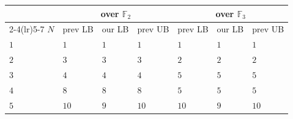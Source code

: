 \documentclass[11pt]{article}
\theoremstyle{definition}
\newcommand{\F}{\mathbb{F}}
\begin{document}
\begin{table}[!ht]
  \centering
  \setlength{\tabcolsep}{6pt}
  \begin{tabular}{lllllll}
    \toprule
    & \multicolumn{3}{c}{over $\F_2$}                             & \multicolumn{3}{c}{over $\F_3$}                                                                                                                                                                                                            \\
    \cmidrule(lr){2-4}\cmidrule(lr){5-7}
    $N$  & prev LB                                                     & our LB                          & prev UB                                                      & prev LB                                                     & our LB       & prev UB                                                      \\
    \midrule
    $1$  & $1$                                                         & $1$                             & $1$                                                          & $1$                                                         & $1$          & $1$                                                          \\
    $2$  & $3$~\cite{winograd1977some}                                 & $3$                             & $3$~\cite{barbulescu2012finding}                         & $2$~\cite{winograd1977some}                                 & $2$          & $2$~\cite{wagh1983structured}                                \\
    $3$  & $4$~\cite{winograd1977some}                                 & $4$                             & $4$~\cite{wagh1983structured}                                & $5$~\cite{winograd1977some}                                 & $5$          & $5$~\cite{barbulescu2012finding}                         \\
    $4$  & $8$~\cite{blaser2005complete,barbulescu2012finding}         & $8$                             & $8$~\cite{barbulescu2012finding}  & $5$~\cite{winograd1977some}                                 & $5$          & $5$~\cite{wagh1983structured}                                \\
    $5$  & $10$~\cite{blaser2005complete,barbulescu2012finding}      & $9$                             & $10$~\cite{wagh1983structured}                               & $10$~\cite{blaser2005complete,barbulescu2012finding}        & $9$          & $10$~\cite{wagh1983structured}                               \\

\end{tabular}
\end{table}
\end{document}
